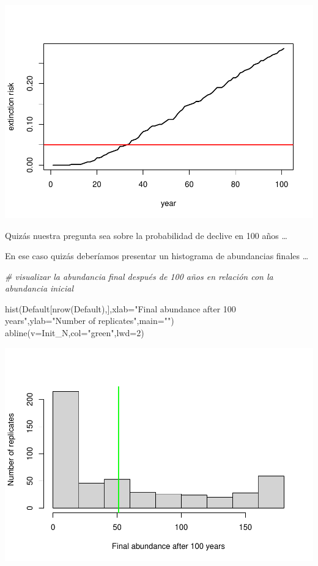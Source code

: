 \documentclass[
]{article}
\newenvironment{Shaded}{\begin{snugshade}}{\end{snugshade}}
\newcommand{\AttributeTok}[1]{\textcolor[rgb]{0.77,0.63,0.00}{#1}}
\newcommand{\CommentTok}[1]{\textcolor[rgb]{0.56,0.35,0.01}{\textit{#1}}}
\newcommand{\DecValTok}[1]{\textcolor[rgb]{0.00,0.00,0.81}{#1}}
\newcommand{\FunctionTok}[1]{\textcolor[rgb]{0.00,0.00,0.00}{#1}}
\newcommand{\NormalTok}[1]{#1}
\newcommand{\StringTok}[1]{\textcolor[rgb]{0.31,0.60,0.02}{#1}}
\begin{document}
\includegraphics{LECTURE12_files/figure-latex/unnamed-chunk-5-1.pdf}

Quizás nuestra pregunta sea sobre la probabilidad de declive en 100 años
\ldots{}

En ese caso quizás deberíamos presentar un histograma de abundancias
finales \ldots{}

\begin{Shaded}
\begin{Highlighting}[]
\CommentTok{\# visualizar la abundancia final después de 100 años en relación con la abundancia inicial}

\FunctionTok{hist}\NormalTok{(Default[}\FunctionTok{nrow}\NormalTok{(Default),],}\AttributeTok{xlab=}\StringTok{"Final abundance after 100 years"}\NormalTok{,}\AttributeTok{ylab=}\StringTok{"Number of replicates"}\NormalTok{,}\AttributeTok{main=}\StringTok{""}\NormalTok{)}
\FunctionTok{abline}\NormalTok{(}\AttributeTok{v=}\NormalTok{Init\_N,}\AttributeTok{col=}\StringTok{"green"}\NormalTok{,}\AttributeTok{lwd=}\DecValTok{2}\NormalTok{)}
\end{Highlighting}
\end{Shaded}

\includegraphics{LECTURE12_files/figure-latex/unnamed-chunk-6-1.pdf}
\end{document}
